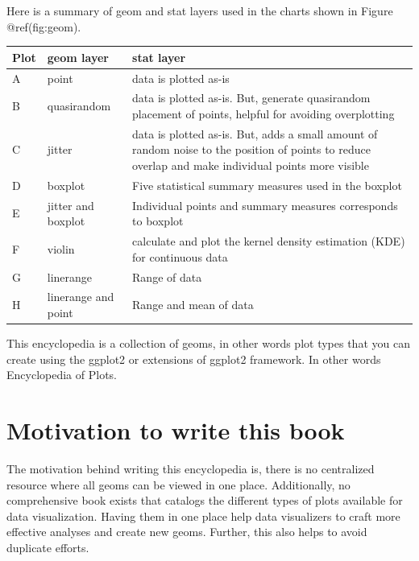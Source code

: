 \documentclass[
  letterpaper,
  DIV=11,
  numbers=noendperiod]{scrreprt}
\begin{document}
Here is a summary of geom and stat layers used in the charts shown in
Figure @ref(fig:geom).

\begin{table}
\centering
\begin{tabular}[t]{l|l|l}
\hline
Plot & geom layer & stat layer\\
\hline
A & point & data is plotted as-is\\
\hline
B & quasirandom & data is plotted as-is. But, generate quasirandom placement of points, helpful for avoiding overplotting\\
\hline
C & jitter & data is plotted as-is. But, adds a small amount of random noise to the position of points to reduce overlap and make individual points more visible\\
\hline
D & boxplot & Five statistical summary measures used in the boxplot\\
\hline
E & jitter and boxplot & Individual points and summary measures corresponds to boxplot\\
\hline
F & violin & calculate and plot the kernel density estimation (KDE) for continuous data\\
\hline
G & linerange & Range of data\\
\hline
H & linerange and point & Range and mean of data\\
\hline
\end{tabular}
\end{table}

This encyclopedia is a collection of geoms, in other words plot types
that you can create using the ggplot2 or extensions of ggplot2
framework. In other words {Encyclopedia of Plots}.

\section*{Motivation to write this
book}\label{motivation-to-write-this-book}


The motivation behind writing this encyclopedia is, there is no
centralized resource where all geoms can be viewed in one place.
Additionally, no comprehensive book exists that catalogs the different
types of plots available for data visualization. Having them in one
place help data visualizers to craft more effective analyses and create
new geoms. Further, this also helps to avoid duplicate efforts.
\end{document}
